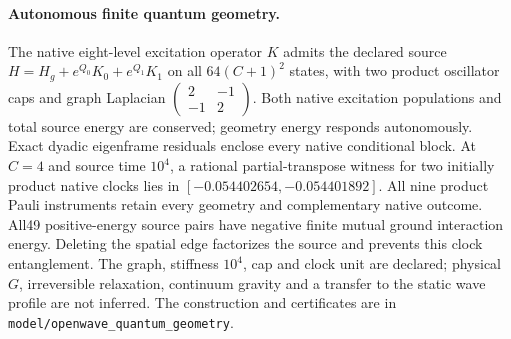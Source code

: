 \paragraph{Autonomous finite quantum geometry.}
The native eight-level excitation operator $K$ admits the declared source
$H=H_g+e^{Q_0}K_0+e^{Q_1}K_1$ on all $64(C+1)^2$ states, with two product
oscillator caps and graph Laplacian
$\left(\begin{smallmatrix}2&-1\\-1&2\end{smallmatrix}\right)$.
Both native excitation populations and total source energy are conserved;
geometry energy responds autonomously. Exact dyadic eigenframe residuals
enclose every native conditional block. At $C=4$ and source time $10^4$,
a rational partial-transpose witness for two initially product native
clocks lies in $[-0.054402654,-0.054401892]$. All nine product Pauli
instruments retain every geometry and complementary native outcome.
All49 positive-energy source pairs have negative finite mutual ground
interaction energy. Deleting the spatial edge factorizes the source and
prevents this clock entanglement. The graph, stiffness $10^4$, cap and
clock unit are declared; physical $G$, irreversible relaxation,
continuum gravity and a transfer to the static wave profile are not
inferred. The construction and certificates are in
\texttt{model/openwave\_quantum\_geometry}.
